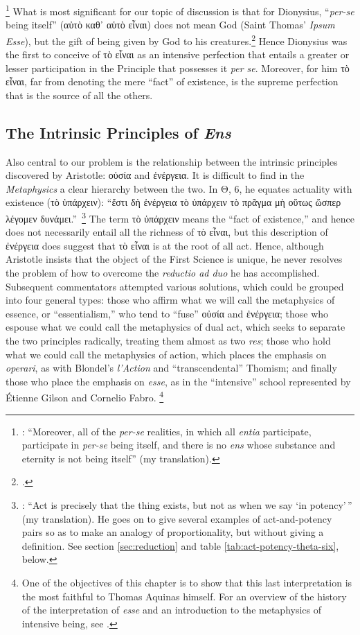 \footnote{\Cite[V, 5]{pg:dionysius:DN}: “Moreover, all of the \emph{per-se} realities, in which all \emph{entia} participate, participate in \emph{per-se} being itself, and there is no \emph{ens} whose substance and eternity is not being itself” (my translation).} What is most significant for our topic of discussion is that for Dionysius, “\emph{per-se} being itself” (αὐτὸ καθ᾿ αὑτὸ εἶναι) does not mean God (Saint Thomas’ \emph{Ipsum Esse}), but the gift of being given by God to his creatures.\footcite[54]{orourke:pseudo-dionysius} Hence Dionysius was the first to conceive of τὸ εἶναι as an intensive perfection that entails a greater or lesser participation in the Principle that possesses it \emph{per se}. Moreover, for him τὸ εἶναι, far from denoting the mere “fact” of existence, is the supreme perfection that is the source of all the others. 

\subsection{The Intrinsic Principles of \emph{Ens}}

Also central to our problem is the relationship between the intrinsic principles discovered by Aristotle: οὐσία and ἐνέργεια. It is difficult to find in the \emph{Metaphysics} a clear hierarchy between the two. In Θ, 6, he equates actuality with existence (τὸ ὑπάρχειν): “ἔστι δὴ ἐνέργεια τὸ ὑπάρχειν τὸ πρᾶγμα μὴ οὕτως ὥσπερ λέγομεν δυνάμει.”\,%
%
\footnote{\Cite[Θ, 6, 1048a31-32]{aristotle:metaphysics}: “Act is precisely that the thing exists, but not as when we say ‘in potency’\,” (my translation). He goes on to give several examples of act-and-potency pairs so as to make an analogy of proportionality, but without giving a definition. See section \ref{sec:reduction} and table \ref{tab:act-potency-theta-six}, below.}
%
The term τὸ ὑπάρχειν means the “fact of existence,” and hence does not necessarily entail all the richness of τὸ εἶναι, but this description of ἐνέργεια does suggest that τὸ εἶναι is at the root of all act. Hence, although Aristotle insists that the object of the First Science is unique, he never resolves the problem of how to overcome the \emph{reductio ad duo} he has accomplished. Subsequent commentators attempted various solutions, which could be grouped into four general types: those who affirm what we will call the metaphysics of essence, or “essentialism,” who tend to “fuse” οὐσία and ἐνέργεια; those who espouse what we could call the metaphysics of dual act, which seeks to separate the two principles radically, treating them almost as two \emph{res}; those who hold what we could call the metaphysics of action, which places the emphasis on \emph{operari}, as with Blondel’s \emph{l’Action} and “transcendental” Thomism; and finally those who place the emphasis on \emph{esse}, as in the “intensive” school represented by Étienne Gilson and Cornelio Fabro.%
%
\footnote{One of the objectives of this chapter is to show that this last interpretation is the most faithful to Thomas Aquinas himself. For an overview of the history of the interpretation of \emph{esse} and an introduction to the metaphysics of intensive being, see \cite{fabro:intensive}.}

